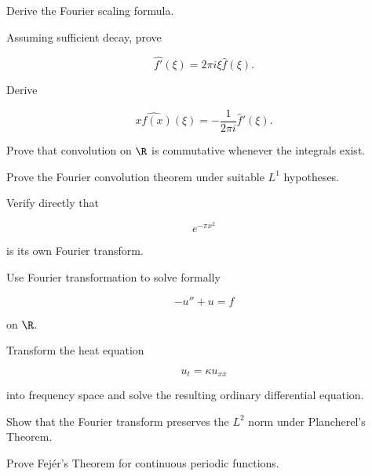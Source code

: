 \begin{exercise}[3]
Derive the Fourier scaling formula.
\end{exercise}

\begin{exercise}[3]
Assuming sufficient decay, prove

\[
\widehat{f'}(\xi)
=
2\pi i\xi\widehat{f}(\xi).
\]
\end{exercise}

\begin{exercise}[3]
Derive

\[
\widehat{xf(x)}(\xi)
=
-\frac{1}{2\pi i}
\widehat{f}'(\xi).
\]
\end{exercise}

\begin{exercise}[3]
Prove that convolution on \(\R\) is commutative whenever the integrals
exist.
\end{exercise}

\begin{exercise}[3]
Prove the Fourier convolution theorem under suitable \(L^1\) hypotheses.
\end{exercise}

\begin{exercise}[3]
Verify directly that

\[
e^{-\pi x^2}
\]

is its own Fourier transform.
\end{exercise}

\begin{exercise}[3]
Use Fourier transformation to solve formally

\[
-u''+u=f
\]

on \(\R\).
\end{exercise}

\begin{exercise}[3]
Transform the heat equation

\[
u_t=\kappa u_{xx}
\]

into frequency space and solve the resulting ordinary differential
equation.
\end{exercise}

\begin{exercise}[3]
Show that the Fourier transform preserves the \(L^2\) norm under
Plancherel's Theorem.
\end{exercise}

\begin{exercise}[4]
Prove Fej\'er's Theorem for continuous periodic functions.
\end{exercise}

